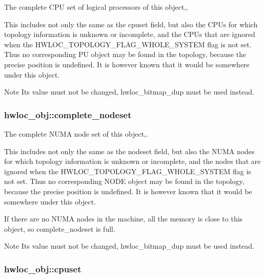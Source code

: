 The complete CPU set of logical processors of this object,. 

This includes not only the same as the cpuset field, but also the CPUs for which topology information is unknown or incomplete, and the CPUs that are ignored when the HWLOC\_\-TOPOLOGY\_\-FLAG\_\-WHOLE\_\-SYSTEM flag is not set. Thus no corresponding PU object may be found in the topology, because the precise position is undefined. It is however known that it would be somewhere under this object.

\begin{DoxyNote}{Note}
Its value must not be changed, hwloc\_\-bitmap\_\-dup must be used instead. 
\end{DoxyNote}
\hypertarget{a00016_ac38c4012127525ef74c5615c526f4c2e}{
\subsubsection[{complete\_\-nodeset}]{ {\bf hwloc\_\-obj::complete\_\-nodeset}}}
\label{a00016_ac38c4012127525ef74c5615c526f4c2e}


The complete NUMA node set of this object,. 

This includes not only the same as the nodeset field, but also the NUMA nodes for which topology information is unknown or incomplete, and the nodes that are ignored when the HWLOC\_\-TOPOLOGY\_\-FLAG\_\-WHOLE\_\-SYSTEM flag is not set. Thus no corresponding NODE object may be found in the topology, because the precise position is undefined. It is however known that it would be somewhere under this object.

If there are no NUMA nodes in the machine, all the memory is close to this object, so {\ttfamily complete\_\-nodeset} is full.

\begin{DoxyNote}{Note}
Its value must not be changed, hwloc\_\-bitmap\_\-dup must be used instead. 
\end{DoxyNote}
\hypertarget{a00016_a67925e0f2c47f50408fbdb9bddd0790f}{
\subsubsection[{cpuset}]{ {\bf hwloc\_\-obj::cpuset}}}
\label{a00016_a67925e0f2c47f50408fbdb9bddd0790f}


